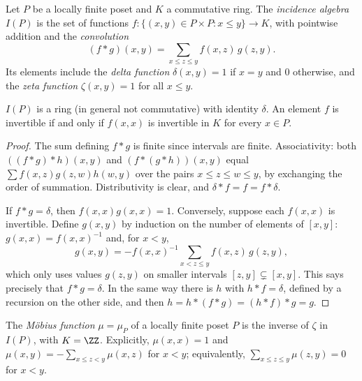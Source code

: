 \begin{definition}\label{combinatorics:definition-incidence-algebra}
Let $P$ be a locally finite poset and $K$ a commutative ring. The \emph{incidence algebra} $I(P)$ is the set of functions $f \colon \{(x, y) \in P \times P : x \leq y\} \to K$, with pointwise addition
and the \emph{convolution}
\[
(f \ast g)(x, y) = \sum_{x \leq z \leq y}f(x, z)\,g(z, y).
\]
Its elements include the \emph{delta function} $\delta(x, y) = 1$ if $x = y$ and $0$ otherwise, and the \emph{zeta function} $\zeta(x, y) = 1$ for all $x \leq y$.
\end{definition}

\begin{proposition}\label{combinatorics:proposition-incidence-algebra}
$I(P)$ is a ring (in general not commutative) with identity $\delta$. An element $f$ is invertible if and only if $f(x, x)$ is invertible in $K$ for every $x \in P$.
\end{proposition}

\begin{proof}
The sum defining $f \ast g$ is finite since intervals are finite. Associativity: both $((f \ast g) \ast h)(x, y)$ and $(f \ast (g \ast h))(x, y)$ equal $\sum f(x, z)g(z, w)h(w, y)$ over the pairs
$x \leq z \leq w \leq y$, by exchanging the order of summation. Distributivity is clear, and $\delta \ast f = f = f \ast \delta$.

If $f \ast g = \delta$, then $f(x, x)g(x, x) = 1$. Conversely, suppose each $f(x, x)$ is invertible. Define $g(x, y)$ by induction on the number of elements of $[x, y]$: $g(x, x) = f(x, x)^{-1}$ and,
for $x < y$,
\[
g(x, y) = -f(x, x)^{-1}\sum_{x < z \leq y}f(x, z)\,g(z, y),
\]
which only uses values $g(z, y)$ on smaller intervals $[z, y] \subsetneq [x, y]$. This says precisely that $f \ast g = \delta$. In the same way there is $h$ with $h \ast f = \delta$, defined by a recursion
on the other side, and then $h = h \ast (f \ast g) = (h \ast f) \ast g = g$.
\end{proof}

\begin{definition}\label{combinatorics:definition-mobius-function}
The \emph{M\"obius function} $\mu = \mu_P$ of a locally finite poset $P$ is the inverse of $\zeta$ in $I(P)$, with $K = \ZZ$. Explicitly, $\mu(x, x) = 1$ and
$\mu(x, y) = -\sum_{x \leq z < y}\mu(x, z)$ for $x < y$; equivalently, $\sum_{x \leq z \leq y}\mu(z, y) = 0$ for $x < y$.
\end{definition}

